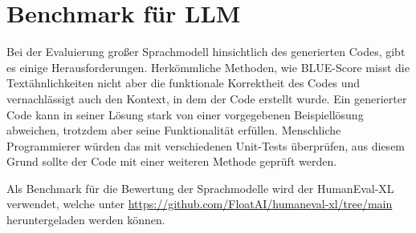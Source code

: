 

\section{Benchmark für LLM}
Bei der Evaluierung großer Sprachmodell hinsichtlich des generierten Codes, gibt es einige Herausforderungen. Herkömmliche Methoden, wie BLUE-Score misst die Textähnlichkeiten nicht aber die funktionale Korrektheit des Codes und vernachlässigt auch den Kontext, in dem der Code erstellt wurde. Ein generierter Code kann in seiner Lösung stark von einer vorgegebenen Beispiellösung abweichen, trotzdem aber seine Funktionalität erfüllen. Menschliche Programmierer würden das mit verschiedenen Unit-Tests überprüfen, aus diesem Grund sollte der Code mit einer weiteren Methode geprüft werden.\vspace{0.2cm}

Als Benchmark für die Bewertung der Sprachmodelle wird der HumanEval-XL verwendet, welche unter \href{https://github.com/FloatAI/humaneval-xl/tree/main}{https://github.com/FloatAI/humaneval-xl/tree/main} heruntergeladen werden können.

